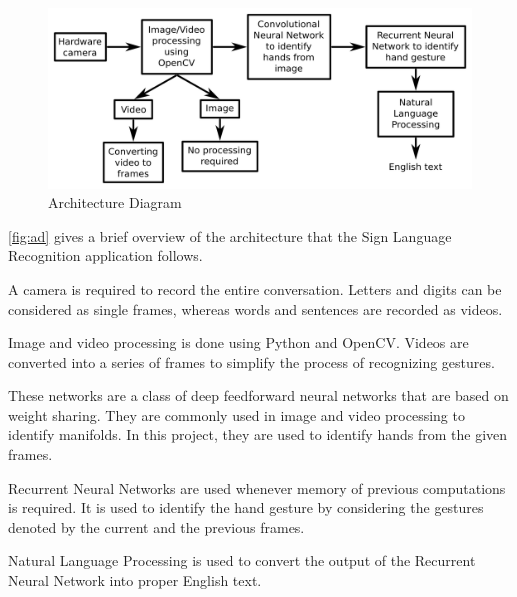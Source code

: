 \documentclass[12pt,oneside,a4paper]{article}
\begin{document}
			\begin{figure}[htp]
				\centering
				\includegraphics{architecture.png}
				\caption{Architecture Diagram}
				\label{fig:ad}
			\end{figure}

			\autoref{fig:ad} gives a brief overview of the architecture that the Sign Language Recognition application follows. \\

			\begin{description}[style=nextline]

				\item[Input module] A camera is required to record the entire conversation. Letters and digits can be considered as single frames, whereas words and sentences are recorded as videos.

				\item[Image and Video Processing] Image and video processing is done using Python and OpenCV. Videos are converted into a series of frames to simplify the process of recognizing gestures.

				\item[Convolutional Neural Network] These networks are a class of deep feedforward neural networks that are based on weight sharing. They are commonly used in image and video processing to identify manifolds. In this project, they are used to identify hands from the given frames.

				\item[Recurrent Neural Network] Recurrent Neural Networks are used whenever memory of previous computations is required. It is used to identify the hand gesture by considering the gestures denoted by the current and the previous frames.

				\item[Natural Language Processing] Natural Language Processing is used to convert the output of the Recurrent Neural Network into proper English text.

			\end{description}
\end{document}
